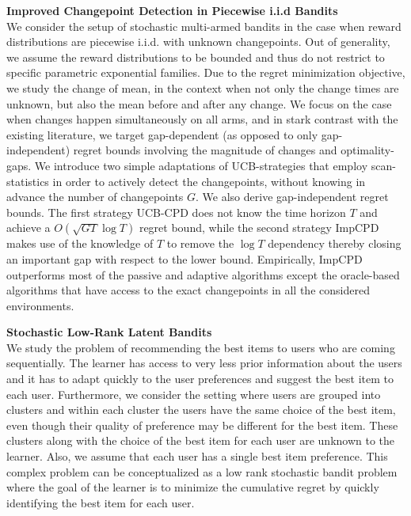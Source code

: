 \documentclass[margin,11pt]{res}
\begin{document}
\begin{resume}
\textbf{Improved Changepoint Detection in Piecewise i.i.d  Bandits}\\
We consider the setup of stochastic multi-armed bandits in the case when reward distributions are piecewise i.i.d. with unknown changepoints. Out of generality, we assume the reward distributions to be bounded and thus do not restrict to specific parametric exponential families. Due to the regret minimization objective, we study the change of mean, in the context when not only the change times are unknown, but also the mean before and after any change. We focus on the case when changes happen simultaneously on all arms, and in stark contrast with the existing literature, we target gap-dependent (as opposed to only gap-independent) regret bounds involving the magnitude of changes and optimality-gaps. We introduce two simple adaptations of UCB-strategies that employ scan-statistics in order to actively detect the changepoints, without knowing in advance the number of changepoints $G$. 
    We also derive gap-independent regret bounds. The first strategy UCB-CPD does not know the time horizon $T$ and achieve a $O(\sqrt{GT}\log T)$ regret bound, while the second strategy ImpCPD makes use of the knowledge of $T$ to remove the $\log T$ dependency thereby closing an important gap with respect to the lower bound. Empirically, ImpCPD outperforms most of the passive and adaptive algorithms except the oracle-based algorithms that have access to the exact changepoints in all the considered environments.

\textbf{Stochastic Low-Rank Latent Bandits}\\
 We study the problem of recommending the best items to users who are coming sequentially. The learner has access to very less prior information about the users and it has to adapt quickly to the user preferences and suggest the best item to each user. Furthermore, we consider the setting where users are grouped into clusters and within each cluster the users have the same choice of the best item, even though their quality of preference may be different for the best item. These clusters along with the choice of the best item for each user are unknown to the learner.  Also, we assume that each user has a single best item preference. This complex problem can be conceptualized as a low rank stochastic bandit problem where the goal of the learner is to minimize the cumulative regret by quickly identifying the best item for each user.



\end{resume}
\end{document}
